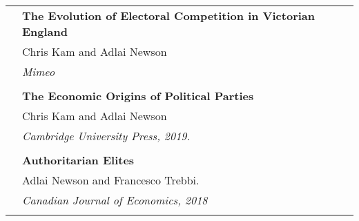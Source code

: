 \documentclass[letterpaper, 11pt]{article}
\begin{document}
\begin{longtable}{p{1.3in}p{4.8in}}
& \textbf{The Evolution of Electoral Competition in Victorian England} \\
& Chris Kam and Adlai Newson \\
& \textit{Mimeo}\\
& \\


\nohyphens{\color{OliveGreen}{Publications}} 
& \textbf{The Economic Origins of Political Parties} \\
& Chris Kam and Adlai Newson \\
& \textit{Cambridge University Press, 2019.}\\
& \\

& \textbf{Authoritarian Elites} \\
& Adlai Newson and Francesco Trebbi. \\
& \textit{Canadian Journal of Economics, 2018}\\
& \\

 

%
%



\end{longtable}
\end{document}
